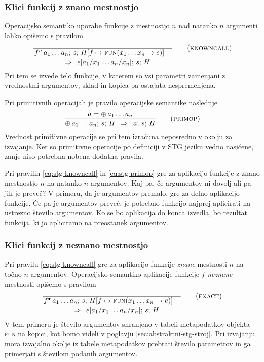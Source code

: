 \subsubsection{Klici funkcij z znano mestnostjo}

Operacijsko semantiko uporabe funkcije z mestnostjo $n$ nad natanko $n$ argumenti lahko opišemo s pravilom
\begin{equation}
	\linfer[knowncall]{}{
		f^n \, a_1 \dots a_n; \, s; \, H[f \mapsto \textsc{fun}(x_1 \dots x_n \to e)]
	}{
		e[a_1 / x_1 \dots a_n / x_n]; \, s; \, H
	}
\label{eq:stg-knowncall}
\end{equation}
Pri tem se izvede telo funkcije, v katerem so vsi parametri zamenjani z vrednostmi argumentov, sklad in kopica pa ostajata nespremenjena.

Pri primitivnih operacijah je pravilo operacijske semantike naslednje
\begin{equation}
	\infer[primop]{
		a = \oplus \, a_1 \dots a_n
	}{
		\oplus \, a_1 \dots a_n; \, s; \, H
	}{
		a; \, s; \, H
	}
\label{eq:stg-primop}
\end{equation}
Vrednost primitivne operacije se pri tem izračuna neposredno v okolju za izvajanje. Ker so primitivne operacije po definiciji v STG jeziku vedno nasičene, zanje niso potrebna nobena dodatna pravila.

Pri pravilih \ref{eq:stg-knowncall} in \ref{eq:stg-primop} gre za aplikacijo funkcije z znano mestnostjo $n$ na natanko $n$ argumentov. Kaj pa, če argumentov ni dovolj ali pa jih je preveč? V primeru, da je argumentov premalo, gre za delno aplikacijo funkcije. Če pa je argumentov preveč, je potrebno funkcijo najprej aplicirati na ustrezno število argumentov. Ko se bo aplikacija do konca izvedla, bo rezultat funkcija, ki jo apliciramo na preostanek argumentov.

\subsubsection{Klici funkcij z neznano mestnostjo}

Pri pravilu \ref{eq:stg-knowncall} gre za aplikacijo funkcije \emph{znane} mestnosti $n$ na točno $n$ argumentov. Operacijsko semantiko aplikacije funkcije $f$ \emph{neznane} mestnosti opišemo s pravilom
\begin{equation}
	\linfer[exact]{}{
		f^\bullet \, a_1 \dots a_n ; \, s; \, H[f \mapsto \textsc{fun}(x_1 \dots x_n \to e)]
	}{
		e[a_1 / x_1 \dots a_n / x_n]; \, s; \, H
	}
\label{eq:stg-exact}
\end{equation}
V tem primeru je število argumentov shranjeno v tabeli metapodatkov ob\-jek\-ta \textsc{fun} na kopici, kot bomo videli v poglavju \ref{sec:abstraktni-stg-stroj}. Pri izvajanju mora izvajalno okolje iz tabele metapodatkov prebrati število parametrov in ga primerjati s številom podanih argumentov.

